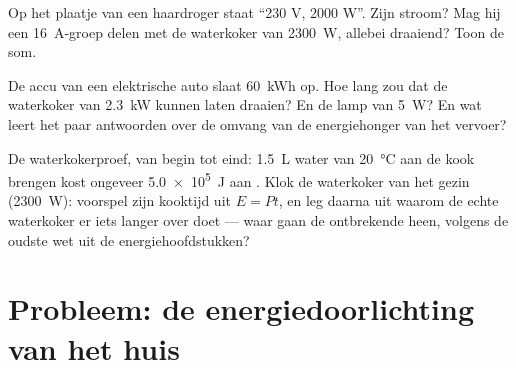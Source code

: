 \begin{exercise}[$\star\star$]\label{exo:g9:electric-power-energy:10}
Op het plaatje van een haardroger staat ``230 V, 2000 W''. Zijn stroom?
Mag hij een \qty{16}{A}-groep delen met de waterkoker van
\qty{2300}{W}, allebei draaiend? Toon de som.
\end{exercise}

\begin{exercise}[$\star\star$]\label{exo:g9:electric-power-energy:11}
De accu van een elektrische auto slaat \qty{60}{kWh} op. Hoe
lang zou dat de waterkoker van \qty{2.3}{kW} kunnen laten draaien? En
de lamp van \qty{5}{W}? En wat leert het paar antwoorden over de
omvang van de energiehonger van het vervoer?
\end{exercise}

\begin{exercise}[$\star\star\star$]\label{exo:g9:electric-power-energy:12}
De waterkokerproef, van begin tot eind: \qty{1.5}{L} water van
\qty{20}{\celsius} aan de kook brengen kost ongeveer \qty{5.0e5}{J} aan
. Klok de waterkoker van het gezin (\qty{2300}{W}):
voorspel zijn kooktijd uit $E = P t$, en leg daarna uit waarom de echte
waterkoker er iets langer over doet --- waar gaan de ontbrekende
 heen, volgens de oudste wet uit de
energiehoofdstukken?
\end{exercise}

\section{Probleem: de energiedoorlichting van het huis}

